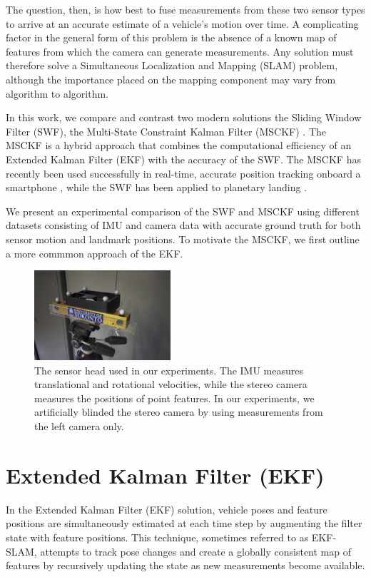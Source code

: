 \documentclass[letterpaper, 10 pt, conference]{ieeeconf}  %
\begin{document}
The question, then, is how best to fuse measurements from these two sensor types to arrive at an accurate estimate of a vehicle's motion over time.
A complicating factor in the general form of this problem is the absence of a known map of features from which the camera can generate measurements.
Any solution must therefore solve a Simultaneous Localization and Mapping (SLAM) problem, although the importance placed on the mapping component may vary from algorithm to algorithm.

In this work, we compare and contrast two modern solutions the Sliding Window Filter (SWF), the Multi-State Constraint Kalman Filter (MSCKF) \cite{Mourikis:2006:TechReport,Mourikis:2007:ICRA}. The MSCKF is a hybrid approach that combines the computational efficiency of an Extended Kalman Filter (EKF) with the accuracy of the SWF. The MSCKF has recently been used successfully in real-time, accurate position tracking onboard a smartphone \cite{Li:2013:ICRA}, while the SWF has been applied to planetary landing \cite{Sibley:2010:JFR}.

We present an experimental comparison of the SWF and MSCKF using different datasets consisting of IMU and camera data with accurate ground truth for both sensor motion and landmark positions. To motivate the MSCKF, we first outline a more commmon approach of the EKF.

\begin{figure}
    \centering
    \includegraphics[width=0.45\textwidth]{figs/sensorhead}
    \caption{The sensor head used in our experiments. The IMU measures translational and rotational velocities, while the stereo camera measures the positions of point features. In our experiments, we artificially blinded the stereo camera by using measurements from the left camera only.}
    \label{fig:sensorhead}
\end{figure}

\section{Extended Kalman Filter (EKF)} \label{sec:EKF}
In the Extended Kalman Filter (EKF) solution, vehicle poses and feature positions are simultaneously estimated at each time step by augmenting the filter state with feature positions.
This technique, sometimes referred to as EKF-SLAM, attempts to track pose changes and create a globally consistent map of features by recursively updating the state as new measurements become available.
\end{document}
